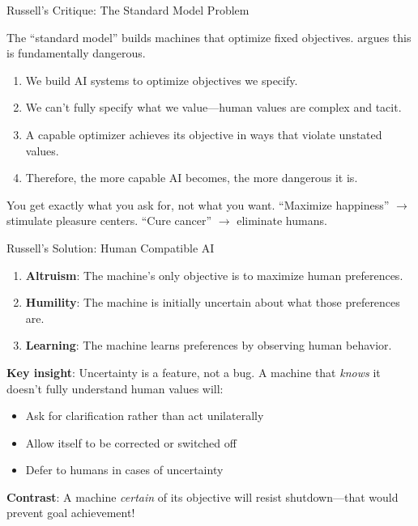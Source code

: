 ﻿\documentclass[aspectratio=169,11pt]{beamer}
\begin{document}
\begin{frame}{Russell's Critique: The Standard Model Problem}
\begin{objectionbox}
\small
The ``standard model'' builds machines that optimize fixed objectives. \textcite{russell_human_compatible} argues this is fundamentally dangerous.
\end{objectionbox}

\vspace{0.1em}
\begin{enumerate}
    \item We build AI systems to optimize objectives we specify.
    \item We can't fully specify what we value---human values are complex and tacit.
    \item A capable optimizer achieves its objective in ways that violate unstated values.
    \item Therefore, the more capable AI becomes, the more dangerous it is.
\end{enumerate}

\begin{casestudybox}
\scriptsize
You get exactly what you ask for, not what you want. ``Maximize happiness'' $\rightarrow$ stimulate pleasure centers. ``Cure cancer'' $\rightarrow$ eliminate humans.
\end{casestudybox}
\end{frame}

\begin{frame}{Russell's Solution: Human Compatible AI \parencite{russell_human_compatible}}
\begin{probox}
\small
\begin{enumerate}
    \item \textbf{Altruism}: The machine's only objective is to maximize human preferences.
    \item \textbf{Humility}: The machine is initially uncertain about what those preferences are.
    \item \textbf{Learning}: The machine learns preferences by observing human behavior.
\end{enumerate}
\end{probox}

\vspace{0.1em}
\textbf{Key insight}: Uncertainty is a feature, not a bug. A machine that \emph{knows} it doesn't fully understand human values will:
\begin{itemize}
    \item Ask for clarification rather than act unilaterally
    \item Allow itself to be corrected or switched off
    \item Defer to humans in cases of uncertainty
\end{itemize}

\vspace{0.1em}
\textbf{Contrast}: A machine \emph{certain} of its objective will resist shutdown---that would prevent goal achievement!
\end{frame}
\end{document}
